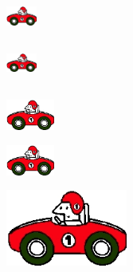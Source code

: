 \documentclass[a4paper,12pt]{article}
\begin{document}
\begin{center}
\includegraphics[width=1cm]{coche}

\includegraphics[width=1cm,height=1.5cm]{coche}

\includegraphics[height=1cm,angle=45]{coche}

\includegraphics[angle=45,height=1cm]{coche}

\includegraphics[width=0.3\textwidth]{coche}

\end{center}
\end{document}
